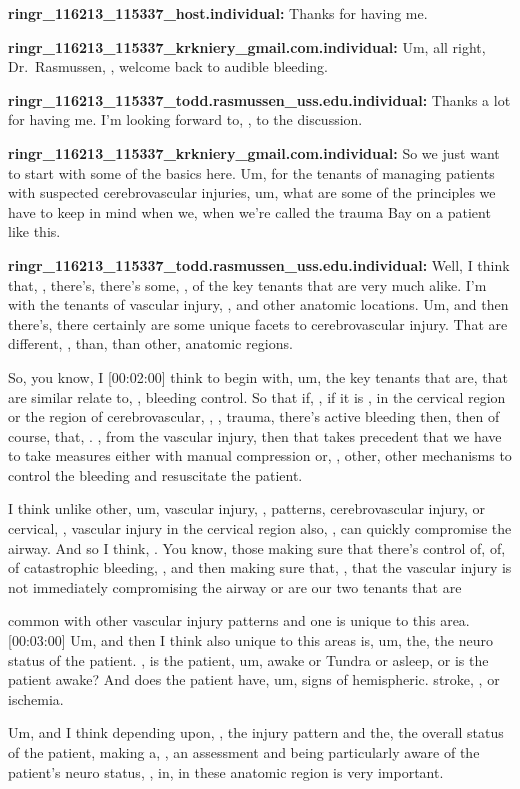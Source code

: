 \documentclass[
]{book}
\begin{document}
\textbf{ringr\_116213\_115337\_host.individual:} Thanks for having me.

\textbf{ringr\_116213\_115337\_krkniery\_gmail.com.individual:} Um, all right,
Dr.~Rasmussen, , welcome back to audible bleeding.

\textbf{ringr\_116213\_115337\_todd.rasmussen\_uss.edu.individual:} Thanks a lot
for having me. I'm looking forward to, , to the discussion.

\textbf{ringr\_116213\_115337\_krkniery\_gmail.com.individual:} So we just want
to start with some of the basics here. Um, for the tenants of managing
patients with suspected cerebrovascular injuries, um, what are some of
the principles we have to keep in mind when we, when we're called the
trauma Bay on a patient like this.

\textbf{ringr\_116213\_115337\_todd.rasmussen\_uss.edu.individual:} Well, I think
that, , there's, there's some, , of the key tenants that are very much
alike. I'm with the tenants of vascular injury, , and other anatomic
locations. Um, and then there's, there certainly are some unique facets
to cerebrovascular injury. That are different, , than, than other,
anatomic regions.

So, you know, I {[}00:02:00{]} think to begin with, um, the key tenants that
are, that are similar relate to, , bleeding control. So that if, , if it
is , in the cervical region or the region of cerebrovascular, , ,
trauma, there's active bleeding then, then of course, that, . , from the
vascular injury, then that takes precedent that we have to take measures
either with manual compression or, , other, other mechanisms to control
the bleeding and resuscitate the patient.

I think unlike other, um, vascular injury, , patterns, cerebrovascular
injury, or cervical, , vascular injury in the cervical region also, ,
can quickly compromise the airway. And so I think, . You know, those
making sure that there's control of, of, of catastrophic bleeding, , and
then making sure that, , that the vascular injury is not immediately
compromising the airway or are our two tenants that are

common with other vascular injury patterns and one is unique to this
area.{[}00:03:00{]} Um, and then I think also unique to this areas is, um,
the, the neuro status of the patient. , is the patient, um, awake or
Tundra or asleep, or is the patient awake? And does the patient have,
um, signs of hemispheric. stroke, , or ischemia.

Um, and I think depending upon, , the injury pattern and the, the
overall status of the patient, making a, , an assessment and being
particularly aware of the patient's neuro status, , in, in these
anatomic region is very important.
\end{document}
